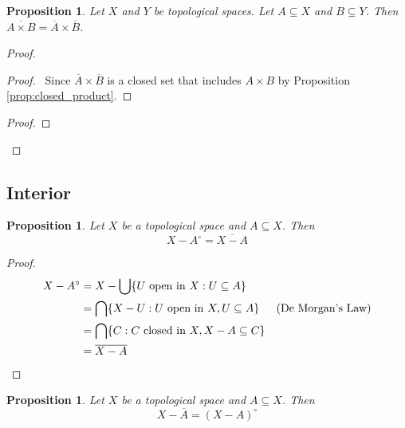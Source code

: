 \documentclass{book}
\let\qed\relax
\newtheorem{prop}[ax]{Proposition}
\theoremstyle{definition}
\begin{document}
\begin{prop}
Let $X$ and $Y$ be topological spaces. Let $A \subseteq X$ and $B \subseteq Y$. Then $\overline{A \times B} = \overline{A} \times \overline{B}$.
\end{prop}

\begin{proof}
\pf
{}
\begin{proof}
	\pf\ Since $\overline{A} \times \overline{B}$ is a closed set that includes $A \times B$ by Proposition \ref{prop:closed_product}.
\end{proof}
\begin{proof}
\end{proof}
\qed
\end{proof}

\subsection{Interior}

\begin{prop}
Let $X$ be a topological space and $A \subseteq X$. Then
\[ X - A^\circ = \overline{X - A} \]
\end{prop}

\begin{proof}
\pf
\begin{align*}
X - A^\circ & = X - \bigcup \{ U \text{ open in } X : U \subseteq A \} \\
& = \bigcap \{ X - U : U \text{ open in } X, U \subseteq A \} & (\text{De Morgan's Law}) \\
& = \bigcap \{ C : C \text{ closed in } X, X - A \subseteq C \} \\
& = \overline{X-A} & \qed
\end{align*}
\end{proof}

\begin{prop}
Let $X$ be a topological space and $A \subseteq X$. Then
\[ X - \overline{A} = (X - A)^\circ \]
\end{prop}
\end{document}
